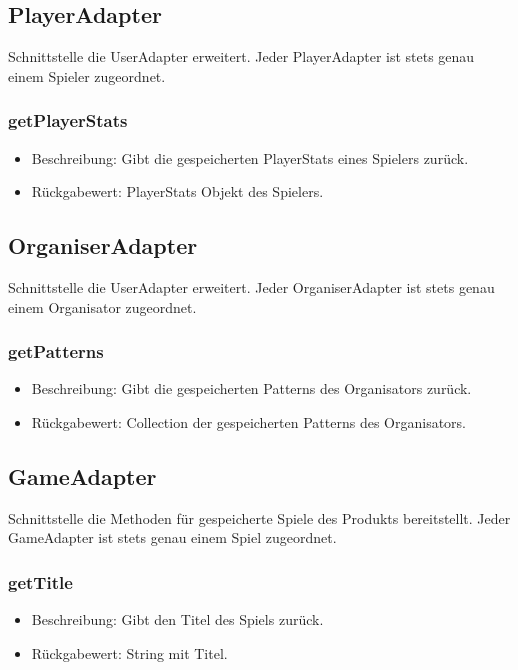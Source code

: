 \documentclass[a4paper]{scrreprt}
\begin{document}
    \subsection{PlayerAdapter}
    Schnittstelle die UserAdapter erweitert.
    Jeder PlayerAdapter ist stets genau einem Spieler zugeordnet.

    \subsubsection{getPlayerStats}
    \begin{itemize}
        \item Beschreibung: Gibt die gespeicherten PlayerStats eines Spielers zurück.
        \item Rückgabewert: PlayerStats Objekt des Spielers.
    \end{itemize}

    \subsection{OrganiserAdapter}
    Schnittstelle die UserAdapter erweitert.
    Jeder OrganiserAdapter ist stets genau einem Organisator zugeordnet.

    \subsubsection{getPatterns}
    \begin{itemize}
        \item Beschreibung: Gibt die gespeicherten Patterns des Organisators zurück.
        \item Rückgabewert: Collection der gespeicherten Patterns des Organisators.
    \end{itemize}

    \subsection{GameAdapter}
    Schnittstelle die Methoden für gespeicherte Spiele des Produkts bereitstellt.
    Jeder GameAdapter ist stets genau einem Spiel zugeordnet.

    \subsubsection{getTitle}
    \begin{itemize}
        \item Beschreibung: Gibt den Titel des Spiels zurück.
        \item Rückgabewert: String mit Titel.
    \end{itemize}
\end{document}
